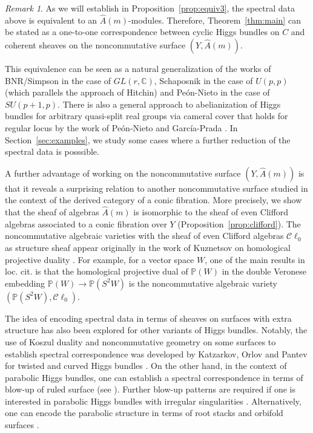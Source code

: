 \documentclass[11pt]{amsart}
\theoremstyle{plain}
\theoremstyle{definition}
\theoremstyle{remark}
\newtheorem{rem}[theorem]{Remark}
\def\C{\mathbb{C}}
\def\P{\mathbb{P}}
\def\wAm{\widehat{A}(m)}
\begin{document}
\begin{rem}
As we will establish in Proposition~\ref{prop:equiv3}, the spectral data above is equivalent to an $\wAm$-modules. Therefore, Theorem~\ref{thm:main} can be stated as a one-to-one correspondence between cyclic Higgs bundles on $C$ and coherent sheaves on the noncommutative surface $(Y,\wAm)$. 
\end{rem}
This equivalence can be seen as a natural generalization of the works of BNR/Simpson in the case of $GL(r,\C)$,  Schaposnik \cite{schaposnik14} in the case of $U(p,p)$ (which parallels the approach of Hitchin) and Pe\'{o}n-Nieto \cite{peónnieto2015cameraldatasup1phiggsbundles} in the case of $SU(p+1,p)$. There is also a general approach to abelianization of Higgs bundles for arbitrary quasi-split real groups via cameral cover that holds for regular locus by the work of Pe\'{o}n-Nieto and Garc\'{i}a-Prada \cite{gp-peon-nieto}. In Section~\ref{sec:examples}, we study some cases where a further reduction of the spectral data is posssible. 

A further advantage of working on the noncommutative surface $(Y, \wAm)$ is that it reveals a surprising relation to another noncommutative surface studied in the context of the derived category of a conic fibration. More precisely, we show that the sheaf of algebras $\wAm$ is isomorphic to the sheaf of even Clifford algebras associated to a conic fibration over $Y$ (Proposition~\ref{prop:clifford}). The noncommutative algebraic varieties with the sheaf of even Clifford algebras $\mathcal{C}\ell_0$ as structure sheaf appear originally in the work of Kuznetsov on homological projective duality \cite{kuznetsov-quadric}. For example, for a vector space $W$, one of the main results in loc. cit. is that the homological projective dual of $\P(W)$ in the double Veronese embedding $\P(W)\to \P(S^2W)$ is the noncommutative algebraic variety $(\P(S^2 W), \mathcal{C}\ell_0)$. 

The idea of encoding spectral data in terms of sheaves on surfaces with extra structure has also been explored for other variants of Higgs bundles. 
Notably, the use of Koszul duality and noncommutative geometry on some surfaces to establish spectral correspondence was developed by Katzarkov, Orlov and Pantev for twisted and curved Higgs bundles \cite{KOP}. On the other hand, in the context of parabolic Higgs bundles, one can establish a spectral correspondence in terms of blow-up of ruled surface (see \cite{lee2025relativespectralcorrespondenceparabolic}). Further blow-up patterns are required if one is interested in parabolic Higgs bundles with irregular singularities \cite{Kontsevich-Soibelman,Szab2017TheBG,Diaconescu_2018}. Alternatively, one can encode the parabolic structure in terms of root stacks and orbifold surfaces \cite{chuang}. 
\end{document}
